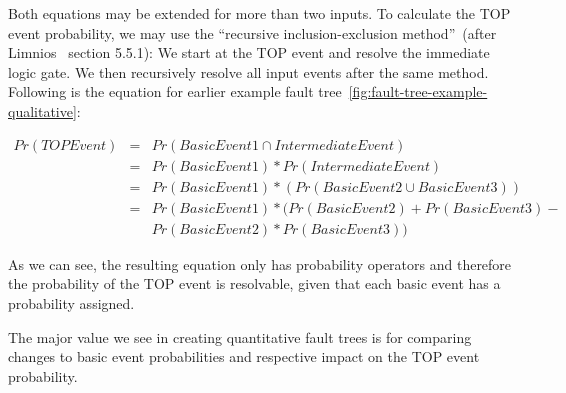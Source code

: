 Both equations may be extended for more than two inputs. To calculate the TOP event probability, we may use the ``recursive inclusion-exclusion method''~(after Limnios~\cite{FaulTreesLimnios} section 5.5.1): We start at the TOP event and resolve the immediate logic gate. We then recursively resolve all input events after the same method. Following is the equation for earlier example fault tree~\ref{fig:fault-tree-example-qualitative}:

\[ \begin{array}{lcl}
Pr(TOP Event) & = & Pr(Basic Event 1 \cap Intermediate Event) \\
 & = & Pr(Basic Event 1) * Pr(Intermediate Event) \\
 & = & Pr(Basic Event 1) * ( Pr(Basic Event 2 \cup Basic Event 3)) \\
 & = & Pr(Basic Event 1) * ( Pr(Basic Event 2) + Pr(Basic Event 3) - \\
 & & Pr(Basic Event 2) * Pr(Basic Event 3))
\end{array} \]

As we can see, the resulting equation only has probability operators and therefore the probability of the TOP event is resolvable, given that each basic event has a probability assigned.

The major value we see in creating quantitative fault trees is for comparing changes to basic event probabilities and respective impact on the TOP event probability.
